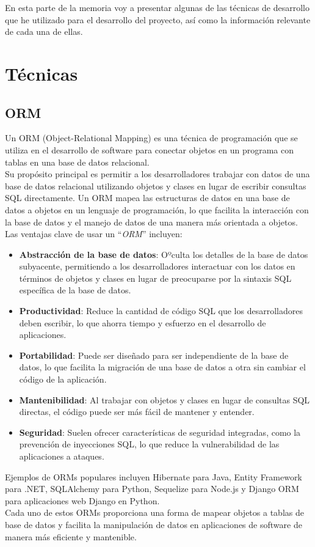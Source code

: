 
En esta parte de la memoria voy a presentar algunas de las técnicas de desarrollo 
que he utilizado para el desarrollo del proyecto, así como la información relevante 
de cada una de ellas.

\section{Técnicas}

\subsection{ORM~\cite{fowler2012patterns}}
\label{ORM}
Un ORM (Object-Relational Mapping) es una técnica de programación que se 
utiliza en el desarrollo de software para conectar objetos en un programa 
con tablas en una base de datos relacional. \\
Su propósito principal es permitir a los desarrolladores trabajar con datos de una base de datos relacional utilizando objetos y clases en lugar de escribir consultas SQL directamente. Un ORM mapea las estructuras de datos en una base de datos a objetos en un lenguaje de programación, lo que facilita la interacción con la base de datos y el manejo de datos de una manera más orientada a objetos.
Las ventajas clave de usar un ``\emph{ORM}'' incluyen:
\begin{itemize}
    \item \textbf{Abstracción de la base de datos}: Oºculta los detalles de la base de datos subyacente, 
    permitiendo a los desarrolladores interactuar con los datos en términos de objetos y clases en lugar de preocuparse por la sintaxis SQL específica de la base de datos.
    \item \textbf{Productividad}: Reduce la cantidad de código SQL que los desarrolladores deben escribir, 
    lo que ahorra tiempo y esfuerzo en el desarrollo de aplicaciones.
    \item \textbf{Portabilidad}: Puede ser diseñado para ser independiente de la base de datos, 
    lo que facilita la migración de una base de datos a otra sin cambiar el código de la aplicación.
    \item \textbf{Mantenibilidad}: Al trabajar con objetos y clases en lugar de consultas SQL directas, 
    el código puede ser más fácil de mantener y entender.
    \item \textbf{Seguridad}: Suelen ofrecer características de seguridad integradas, 
    como la prevención de inyecciones SQL, lo que reduce la vulnerabilidad de las aplicaciones a ataques. 
\end{itemize}
Ejemplos de ORMs populares incluyen Hibernate para Java, Entity Framework para .NET, 
SQLAlchemy para Python, Sequelize para Node.js y Django ORM para aplicaciones web Django en Python. \\
Cada uno de estos ORMs proporciona una forma de mapear objetos a tablas de base de datos y facilita 
la manipulación de datos en aplicaciones de software de manera más eficiente y mantenible.

